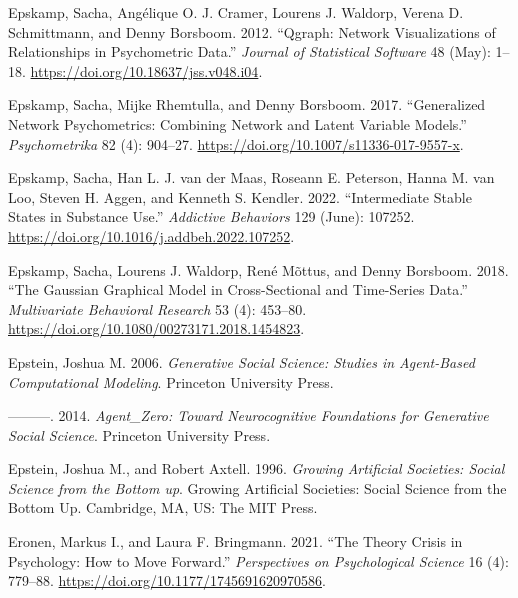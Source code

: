 \documentclass[
  letterpaper,
]{scrbook}
\newlength{\cslhangindent}
\newlength{\cslentryspacingunit} %
\newenvironment{CSLReferences}[2] %
 {%
  \setlength{\parindent}{0pt}
  \ifodd #1
  \let\oldpar\par
  \def\par{\hangindent=\cslhangindent\oldpar}
  \fi
  \setlength{\parskip}{#2\cslentryspacingunit}
 }%
 {}
\begin{document}
\begin{CSLReferences}{1}{0}
\leavevmode{}%
Epskamp, Sacha, Angélique O. J. Cramer, Lourens J. Waldorp, Verena D.
Schmittmann, and Denny Borsboom. 2012. {``Qgraph: {Network
Visualizations} of {Relationships} in {Psychometric Data}.''}
\emph{Journal of Statistical Software} 48 (May): 1--18.
\url{https://doi.org/10.18637/jss.v048.i04}.

\leavevmode{}%
Epskamp, Sacha, Mijke Rhemtulla, and Denny Borsboom. 2017.
{``Generalized {Network Psychometrics}: {Combining Network} and {Latent
Variable Models}.''} \emph{Psychometrika} 82 (4): 904--27.
\url{https://doi.org/10.1007/s11336-017-9557-x}.

\leavevmode{}%
Epskamp, Sacha, Han L. J. van der Maas, Roseann E. Peterson, Hanna M.
van Loo, Steven H. Aggen, and Kenneth S. Kendler. 2022. {``Intermediate
Stable States in Substance Use.''} \emph{Addictive Behaviors} 129
(June): 107252. \url{https://doi.org/10.1016/j.addbeh.2022.107252}.

\leavevmode{}%
Epskamp, Sacha, Lourens J. Waldorp, René Mõttus, and Denny Borsboom.
2018. {``The {Gaussian Graphical Model} in {Cross-Sectional} and
{Time-Series Data}.''} \emph{Multivariate Behavioral Research} 53 (4):
453--80. \url{https://doi.org/10.1080/00273171.2018.1454823}.

\leavevmode{}%
Epstein, Joshua M. 2006. \emph{Generative {Social Science}: {Studies} in
{Agent-Based Computational Modeling}}. {Princeton University Press}.

\leavevmode{}%
---------. 2014. \emph{Agent\_{Zero}: {Toward Neurocognitive
Foundations} for {Generative Social Science}}. {Princeton University
Press}.

\leavevmode{}%
Epstein, Joshua M., and Robert Axtell. 1996. \emph{Growing Artificial
Societies: {Social} Science from the Bottom up}. Growing Artificial
Societies: {Social} Science from the Bottom Up. {Cambridge, MA, US}:
{The MIT Press}.

\leavevmode{}%
Eronen, Markus I., and Laura F. Bringmann. 2021. {``The {Theory Crisis}
in {Psychology}: {How} to {Move Forward}.''} \emph{Perspectives on
Psychological Science} 16 (4): 779--88.
\url{https://doi.org/10.1177/1745691620970586}.


\end{CSLReferences}
\end{document}

